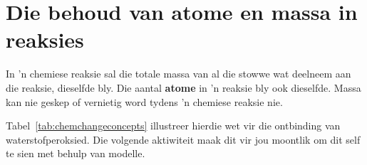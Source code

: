     \label{m38711*cid5}
            \section{Die behoud van atome en massa in reaksies}
            \nopagebreak
      \label{m38711*id64489}In 'n chemiese reaksie sal die totale massa van al die stowwe wat deelneem aan die reaksie, dieselfde bly. Die aantal  \textbf{atome} in 'n reaksie bly ook dieselfde. Massa kan nie geskep of vernietig word tydens 'n chemiese reaksie nie. \par 
{}
Tabel~\ref{tab:chemchangeconcepts} illustreer hierdie wet vir die ontbinding van waterstofperoksied. Die volgende aktiwiteit maak dit vir jou moontlik om dit self te sien met behulp van modelle.
